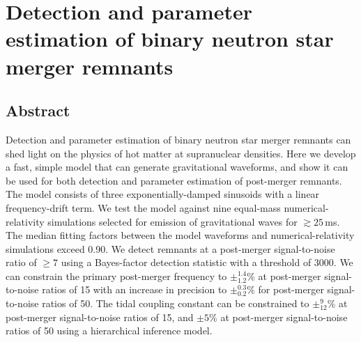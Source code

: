 \documentclass[../Thesis.tex]{subfiles}
\begin{document}
\begingroup
\clearpage%
\let\clearpage\relax%
\vspace*{-2cm}%



\chapter{Detection and parameter estimation of binary neutron star merger remnants}
\label{chapter:DetectionPE}
\endgroup





\section*{Abstract}
    Detection and parameter estimation of binary neutron star merger remnants can shed light on the physics of hot matter at supranuclear densities.
    Here we develop a fast, simple model that can generate gravitational waveforms, and show it can be used for both detection and parameter estimation of post-merger remnants.
    The model consists of three exponentially-damped sinusoids with a linear frequency-drift term.
    We test the model against nine equal-mass numerical-relativity simulations selected for emission of gravitational waves for $\gtrsim25$\,ms.
    The median fitting factors between the model waveforms and numerical-relativity simulations exceed 0.90.
    We detect remnants at a post-merger signal-to-noise ratio of $\ge 7$ using a Bayes-factor detection statistic with a threshold of 3000.
    We can constrain the primary post-merger frequency to $\pm_{1.2}^{1.4}\%$ at post-merger signal-to-noise ratios of 15 with an increase in precision to $\pm_{0.2}^{0.3}\%$ for post-merger signal-to-noise ratios of 50.
    The tidal coupling constant can be constrained to $\pm^{9}_{12}\%$ at post-merger signal-to-noise ratios of 15, and $\pm 5\%$ at post-merger signal-to-noise ratios of 50 using a hierarchical inference model.

\end{document}
